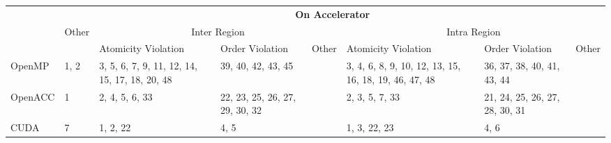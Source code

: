 \documentclass[border=10pt]{standalone}
\begin{document}
\begin{tabular}{|p{2cm}|p{1.5cm}|p{3cm}|p{2cm}|p{1.5cm}|p{3cm}|p{3cm}|p{1.5cm}|}
\hline
\multirow{3}{*}{} & \multicolumn{7}{c|}{\textbf{On Accelerator}}                                                                                                                                                                              \\ \cline{2-8} 
                  & \multirow{2}{*}{Other} & \multicolumn{3}{c|}{Inter Region}                                                      & \multicolumn{3}{c|}{Intra Region}                                                              \\ \cline{3-8} 
                  &                        & Atomicity Violation                           & Order Violation                & Other & Atomicity Violation                                   & Order Violation                & Other \\ \hline
OpenMP            & 1, 2                   & 3, 5, 6, 7, 9, 11, 12, 14, 15, 17, 18, 20, 48 & 39, 40, 42, 43, 45             &       & 3, 4, 6, 8, 9, 10, 12, 13, 15, 16, 18, 19, 46, 47, 48 & 36, 37, 38, 40, 41, 43, 44     &       \\ \hline
OpenACC           & 1                      & 2, 4, 5, 6, 33                                & 22, 23, 25, 26, 27, 29, 30, 32 &       & 2, 3, 5, 7, 33                                        & 21, 24, 25, 26, 27, 28, 30, 31 &       \\ \hline
CUDA              & 7                      & 1, 2, 22                                      & 4, 5                           &       & 1, 3, 22, 23                                          & 4, 6                           &       \\ \hline
\end{tabular}
\end{document}
